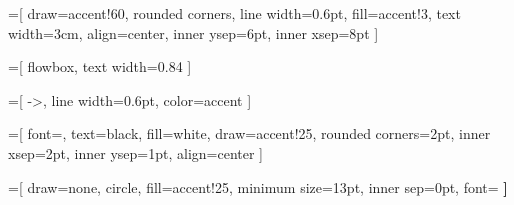 

=[
  draw=accent!60,
  rounded corners,
  line width=0.6pt,
  fill=accent!3,
  text width=3cm,
  align=center,
  inner ysep=6pt,
  inner xsep=8pt
]

=[
  flowbox,
  text width=0.84\linewidth
]

=[
  ->,
  line width=0.6pt,
  color=accent
]

=[
  font=\scriptsize,
  text=black,
  fill=white,
  draw=accent!25,
  rounded corners=2pt,
  inner xsep=2pt,
  inner ysep=1pt,
  align=center
]

=[
  draw=none,
  circle,
  fill=accent!25,
  minimum size=13pt,
  inner sep=0pt,
  font=\scriptsize\bfseries
]
